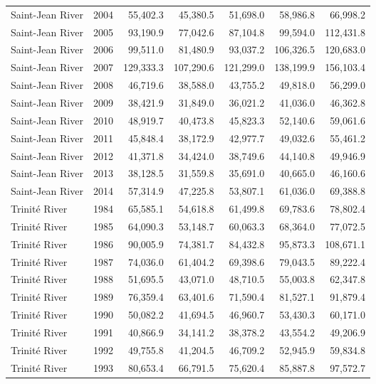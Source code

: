 \begin{longtable}{llrrrrr}
  Saint-Jean River & 2004 & 55,402.3 & 45,380.5 & 51,698.0 & 58,986.8 & 66,998.2 \\ 
  Saint-Jean River & 2005 & 93,190.9 & 77,042.6 & 87,104.8 & 99,594.0 & 112,431.8 \\ 
  Saint-Jean River & 2006 & 99,511.0 & 81,480.9 & 93,037.2 & 106,326.5 & 120,683.0 \\ 
  Saint-Jean River & 2007 & 129,333.3 & 107,290.6 & 121,299.0 & 138,199.9 & 156,103.4 \\ 
  Saint-Jean River & 2008 & 46,719.6 & 38,588.0 & 43,755.2 & 49,818.0 & 56,299.0 \\ 
  Saint-Jean River & 2009 & 38,421.9 & 31,849.0 & 36,021.2 & 41,036.0 & 46,362.8 \\ 
  Saint-Jean River & 2010 & 48,919.7 & 40,473.8 & 45,823.3 & 52,140.6 & 59,061.6 \\ 
  Saint-Jean River & 2011 & 45,848.4 & 38,172.9 & 42,977.7 & 49,032.6 & 55,461.2 \\ 
  Saint-Jean River & 2012 & 41,371.8 & 34,424.0 & 38,749.6 & 44,140.8 & 49,946.9 \\ 
  Saint-Jean River & 2013 & 38,128.5 & 31,559.8 & 35,691.0 & 40,665.0 & 46,160.6 \\ 
  Saint-Jean River & 2014 & 57,314.9 & 47,225.8 & 53,807.1 & 61,036.0 & 69,388.8 \\ 
  Trinité River & 1984 & 65,585.1 & 54,618.8 & 61,499.8 & 69,783.6 & 78,802.4 \\ 
  Trinité River & 1985 & 64,090.3 & 53,148.7 & 60,063.3 & 68,364.0 & 77,072.5 \\ 
  Trinité River & 1986 & 90,005.9 & 74,381.7 & 84,432.8 & 95,873.3 & 108,671.1 \\ 
  Trinité River & 1987 & 74,036.0 & 61,404.2 & 69,398.6 & 79,043.5 & 89,222.4 \\ 
  Trinité River & 1988 & 51,695.5 & 43,071.0 & 48,710.5 & 55,003.8 & 62,347.8 \\ 
  Trinité River & 1989 & 76,359.4 & 63,401.6 & 71,590.4 & 81,527.1 & 91,879.4 \\ 
  Trinité River & 1990 & 50,082.2 & 41,694.5 & 46,960.7 & 53,430.3 & 60,171.0 \\ 
  Trinité River & 1991 & 40,866.9 & 34,141.2 & 38,378.2 & 43,554.2 & 49,206.9 \\ 
  Trinité River & 1992 & 49,755.8 & 41,204.5 & 46,709.2 & 52,945.9 & 59,834.8 \\ 
  Trinité River & 1993 & 80,653.4 & 66,791.5 & 75,620.4 & 85,887.8 & 97,572.7 \\ 

\end{longtable}
